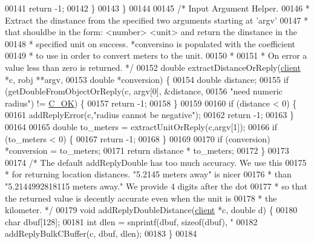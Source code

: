\begin{DoxyCode}
{00141         \textcolor{keywordflow}{return} -1;
00142     \}
00143 \}
00144 
00145 \textcolor{comment}{/* Input Argument Helper.}
00146 \textcolor{comment}{ * Extract the dinstance from the specified two arguments starting at 'argv'}
00147 \textcolor{comment}{ * that shouldbe in the form: <number> <unit> and return the dinstance in the}
00148 \textcolor{comment}{ * specified unit on success. *conversino is populated with the coefficient}
00149 \textcolor{comment}{ * to use in order to convert meters to the unit.}
00150 \textcolor{comment}{ *}
00151 \textcolor{comment}{ * On error a value less than zero is returned. */}
00152 \textcolor{keywordtype}{double} extractDistanceOrReply(\hyperlink{structclient}{client} *c, robj **argv,
00153                                      \textcolor{keywordtype}{double} *conversion) \{
00154     \textcolor{keywordtype}{double} distance;
00155     \textcolor{keywordflow}{if} (getDoubleFromObjectOrReply(c, argv[0], &distance,
00156                                    \textcolor{stringliteral}{"need numeric radius"}) != \hyperlink{server_8h_a303769ef1065076e68731584e758d3e1}{C\_OK}) \{
00157         \textcolor{keywordflow}{return} -1;
00158     \}
00159 
00160     \textcolor{keywordflow}{if} (distance < 0) \{
00161         addReplyError(c,\textcolor{stringliteral}{"radius cannot be negative"});
00162         \textcolor{keywordflow}{return} -1;
00163     \}
00164 
00165     \textcolor{keywordtype}{double} to\_meters = extractUnitOrReply(c,argv[1]);
00166     \textcolor{keywordflow}{if} (to\_meters < 0) \{
00167         \textcolor{keywordflow}{return} -1;
00168     \}
00169 
00170     \textcolor{keywordflow}{if} (conversion) *conversion = to\_meters;
00171     \textcolor{keywordflow}{return} distance * to\_meters;
00172 \}
00173 
00174 \textcolor{comment}{/* The default addReplyDouble has too much accuracy.  We use this}
00175 \textcolor{comment}{ * for returning location distances. "5.2145 meters away" is nicer}
00176 \textcolor{comment}{ * than "5.2144992818115 meters away." We provide 4 digits after the dot}
00177 \textcolor{comment}{ * so that the returned value is decently accurate even when the unit is}
00178 \textcolor{comment}{ * the kilometer. */}
00179 \textcolor{keywordtype}{void} addReplyDoubleDistance(\hyperlink{structclient}{client} *c, \textcolor{keywordtype}{double} d) \{
00180     \textcolor{keywordtype}{char} dbuf[128];
00181     \textcolor{keywordtype}{int} dlen = snprintf(dbuf, \textcolor{keyword}{sizeof}(dbuf), \textcolor{stringliteral}{"%
00182     addReplyBulkCBuffer(c, dbuf, dlen);
00183 \}
00184 
}}
\end{DoxyCode}
